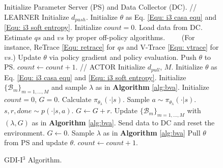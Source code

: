 \begin{figure}[ht]
  \centering
  \begin{minipage}{.7\linewidth}
    \begin{algorithm}[H]
      \caption{GDI-I$^3$ Algorithm.}  
          \begin{algorithmic}
            \STATE Initialize Parameter Server (PS) and Data Collector (DC).
            \STATE
            \STATE // LEARNER
            \STATE Initialize $d_{push}$.
            \STATE Initialize $\theta$ as Eq. \eqref{Equ: i3 casa equ} and \eqref{Equ: i3 soft entropy}.
            \STATE Initialize $count = 0$.
                \STATE Load data from DC.
                \STATE Estimate $qs$ and $vs$ by proper off-policy algorithms.
                \STATE \ \ \ \ (For instance, ReTrace \eqref{Equ: retrace} for $qs$ and V-Trace \eqref{Equ: vtrace} for $vs$.)
                \STATE Update $\theta$ via policy gradient and policy evaluation.
                    \STATE Push $\theta$ to PS.
                \ENDIF
                \STATE $count \leftarrow count + 1$.
            \ENDWHILE
            \STATE
            \STATE // ACTOR
            \STATE Initialize $d_{pull}$, $M$.
            \STATE Initialize $\theta$ as Eq. \eqref{Equ: i3 casa equ} and \eqref{Equ: i3 soft entropy}.
            \STATE Initialize $\{\mathcal{B}_m\}_{m=1,...,M}$ and sample $\lambda$ as in \textbf{Algorithm} \ref{alg:bva}.
            \STATE Initialize $count = 0$, $G = 0$.
                \STATE Calculate $\pi_{\theta_{\lambda}}(\cdot | s)$.
                \STATE Sample $a \sim \pi_{\theta_{\lambda}}(\cdot | s)$.
                \STATE $s, r, done \sim p(\cdot | s, a)$.
                \STATE $G \leftarrow G + r$.
                    \STATE Update $\{\mathcal{B}_m\}_{m=1,...,M}$ with $(\lambda, G)$ as in \textbf{Algorithm} \ref{alg:bva}.
                    \STATE Send data to DC and reset the environment.
                    \STATE $G \leftarrow 0$.
                    \STATE Sample $\lambda$ as in \textbf{Algorithm} \ref{alg:bva}
                \ENDIF
                    \STATE Pull $\theta$ from PS and update $\theta$.
                \ENDIF
                \STATE $count \leftarrow count + 1$.
            \ENDWHILE
          \end{algorithmic}
        \label{alg:i3}
    \end{algorithm}
  \end{minipage}
\end{figure}

